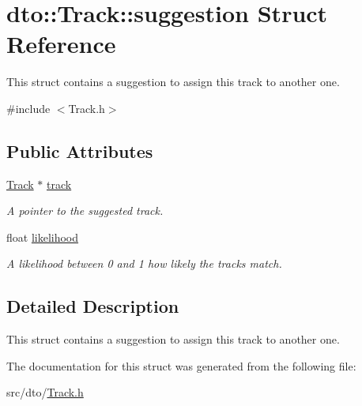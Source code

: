 \hypertarget{structdto_1_1_track_1_1suggestion}{}\section{dto\+:\+:Track\+:\+:suggestion Struct Reference}
\label{structdto_1_1_track_1_1suggestion}


This struct contains a suggestion to assign this track to another one.  




{\ttfamily \#include $<$Track.\+h$>$}

\subsection*{Public Attributes}
\begin{DoxyCompactItemize}
\item 
\mbox{\label{structdto_1_1_track_1_1suggestion_aa498cfe9538f28f128d820e6fe26e253}} 
\mbox{\hyperlink{structdto_1_1_track}{Track}} $\ast$ \mbox{\hyperlink{structdto_1_1_track_1_1suggestion_aa498cfe9538f28f128d820e6fe26e253}{track}}
\begin{DoxyCompactList}\small\item\em A pointer to the suggested track. \end{DoxyCompactList}\item 
\mbox{\label{structdto_1_1_track_1_1suggestion_a29a852db0838dfed9569d2043cc3d56a}} 
float \mbox{\hyperlink{structdto_1_1_track_1_1suggestion_a29a852db0838dfed9569d2043cc3d56a}{likelihood}}
\begin{DoxyCompactList}\small\item\em A likelihood between 0 and 1 how likely the tracks match. \end{DoxyCompactList}\end{DoxyCompactItemize}


\subsection{Detailed Description}
This struct contains a suggestion to assign this track to another one. 

The documentation for this struct was generated from the following file\+:\begin{DoxyCompactItemize}
\item 
src/dto/\mbox{\hyperlink{_track_8h}{Track.\+h}}\end{DoxyCompactItemize}
